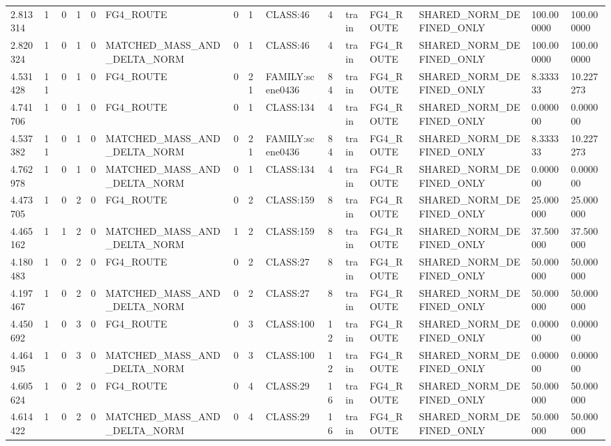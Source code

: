 \begin{tabular}{lllllllllllllll}
2.813314 & 1 & 0 & 1 & 0 & FG4\_ROUTE & 0 & 1 & CLASS:46 & 4 & train & FG4\_ROUTE & SHARED\_NORM\_DEFINED\_ONLY & 100.000000 & 100.000000 \\
2.820324 & 1 & 0 & 1 & 0 & MATCHED\_MASS\_AND\_DELTA\_NORM & 0 & 1 & CLASS:46 & 4 & train & FG4\_ROUTE & SHARED\_NORM\_DEFINED\_ONLY & 100.000000 & 100.000000 \\
4.531428 & 11 & 0 & 1 & 0 & FG4\_ROUTE & 0 & 21 & FAMILY:scene0436 & 84 & train & FG4\_ROUTE & SHARED\_NORM\_DEFINED\_ONLY & 8.333333 & 10.227273 \\
4.741706 & 1 & 0 & 1 & 0 & FG4\_ROUTE & 0 & 1 & CLASS:134 & 4 & train & FG4\_ROUTE & SHARED\_NORM\_DEFINED\_ONLY & 0.000000 & 0.000000 \\
4.537382 & 11 & 0 & 1 & 0 & MATCHED\_MASS\_AND\_DELTA\_NORM & 0 & 21 & FAMILY:scene0436 & 84 & train & FG4\_ROUTE & SHARED\_NORM\_DEFINED\_ONLY & 8.333333 & 10.227273 \\
4.762978 & 1 & 0 & 1 & 0 & MATCHED\_MASS\_AND\_DELTA\_NORM & 0 & 1 & CLASS:134 & 4 & train & FG4\_ROUTE & SHARED\_NORM\_DEFINED\_ONLY & 0.000000 & 0.000000 \\
4.473705 & 1 & 0 & 2 & 0 & FG4\_ROUTE & 0 & 2 & CLASS:159 & 8 & train & FG4\_ROUTE & SHARED\_NORM\_DEFINED\_ONLY & 25.000000 & 25.000000 \\
4.465162 & 1 & 1 & 2 & 0 & MATCHED\_MASS\_AND\_DELTA\_NORM & 1 & 2 & CLASS:159 & 8 & train & FG4\_ROUTE & SHARED\_NORM\_DEFINED\_ONLY & 37.500000 & 37.500000 \\
4.180483 & 1 & 0 & 2 & 0 & FG4\_ROUTE & 0 & 2 & CLASS:27 & 8 & train & FG4\_ROUTE & SHARED\_NORM\_DEFINED\_ONLY & 50.000000 & 50.000000 \\
4.197467 & 1 & 0 & 2 & 0 & MATCHED\_MASS\_AND\_DELTA\_NORM & 0 & 2 & CLASS:27 & 8 & train & FG4\_ROUTE & SHARED\_NORM\_DEFINED\_ONLY & 50.000000 & 50.000000 \\
4.450692 & 1 & 0 & 3 & 0 & FG4\_ROUTE & 0 & 3 & CLASS:100 & 12 & train & FG4\_ROUTE & SHARED\_NORM\_DEFINED\_ONLY & 0.000000 & 0.000000 \\
4.464945 & 1 & 0 & 3 & 0 & MATCHED\_MASS\_AND\_DELTA\_NORM & 0 & 3 & CLASS:100 & 12 & train & FG4\_ROUTE & SHARED\_NORM\_DEFINED\_ONLY & 0.000000 & 0.000000 \\
4.605624 & 1 & 0 & 2 & 0 & FG4\_ROUTE & 0 & 4 & CLASS:29 & 16 & train & FG4\_ROUTE & SHARED\_NORM\_DEFINED\_ONLY & 50.000000 & 50.000000 \\
4.614422 & 1 & 0 & 2 & 0 & MATCHED\_MASS\_AND\_DELTA\_NORM & 0 & 4 & CLASS:29 & 16 & train & FG4\_ROUTE & SHARED\_NORM\_DEFINED\_ONLY & 50.000000 & 50.000000 \\

\end{tabular}
